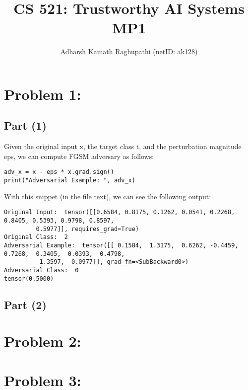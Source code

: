 \documentclass{article}
\title{CS 521: Trustworthy AI Systems \\ MP1}
\author{Adharsh Kamath Raghupathi (netID: ak128)}
\date{}
\begin{document}
\maketitle
\section*{Problem 1:}
\subsection*{Part (1)}
Given the original input x, the target class t, and the perturbation magnitude eps, we can compute FGSM adversary as follows:
\begin{verbatim}
adv_x = x - eps * x.grad.sign()
print("Adversarial Example: ", adv_x)
\end{verbatim}
With this snippet (in the file \href{URL}{text}), we can see the following output:
\begin{verbatim}
Original Input:  tensor([[0.6584, 0.8175, 0.1262, 0.0541, 0.2268, 0.8405, 0.5393, 0.9798, 0.8597,
         0.5977]], requires_grad=True)
Original Class:  2
Adversarial Example:  tensor([[ 0.1584,  1.3175,  0.6262, -0.4459,  0.7268,  0.3405,  0.0393,  0.4798,
          1.3597,  0.0977]], grad_fn=<SubBackward0>)
Adversarial Class:  0
tensor(0.5000)
\end{verbatim}
\subsection*{Part (2)}

\section*{Problem 2:}

\section*{Problem 3:}
\end{document}
